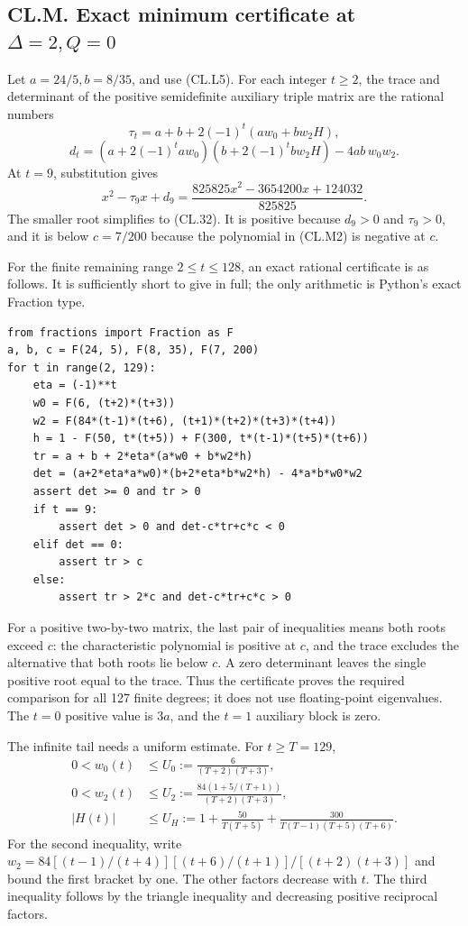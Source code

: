 \documentclass[a4paper,11pt]{article}
\numberwithin{equation}{section}
\begin{document}
\hypertarget{cl.m.-exact-minimum-certificate-at-delta2q0}{%
\subsection{\texorpdfstring{CL.M. Exact minimum certificate at \(\Delta=2,Q=0\)}{CL.M. Exact minimum certificate at \textbackslash Delta=2,Q=0}}\label{cl.m.-exact-minimum-certificate-at-delta2q0}}

Let \(a=24/5,b=8/35\), and use (CL.L5). For each integer \(t\geq2\), the trace and determinant of the positive semidefinite auxiliary triple matrix are the rational numbers \[
\tau_t=a+b+2(-1)^t(aw_0+bw_2H),
\] \[
d_t=(a+2(-1)^taw_0)(b+2(-1)^tbw_2H)-4ab\,w_0w_2.
\tag{CL.M1}
\] At \(t=9\), substitution gives \[
x^2-\tau_9x+d_9
=\frac{825825x^2-3654200x+124032}{825825}.
\tag{CL.M2}
\] The smaller root simplifies to (CL.32). It is positive because \(d_9>0\) and \(\tau_9>0\), and it is below \(c=7/200\) because the polynomial in (CL.M2) is negative at \(c\).

For the finite remaining range \(2\leq t\leq128\), an exact rational certificate is as follows. It is sufficiently short to give in full; the only arithmetic is Python's exact Fraction type.

\begin{verbatim}
from fractions import Fraction as F
a, b, c = F(24, 5), F(8, 35), F(7, 200)
for t in range(2, 129):
    eta = (-1)**t
    w0 = F(6, (t+2)*(t+3))
    w2 = F(84*(t-1)*(t+6), (t+1)*(t+2)*(t+3)*(t+4))
    h = 1 - F(50, t*(t+5)) + F(300, t*(t-1)*(t+5)*(t+6))
    tr = a + b + 2*eta*(a*w0 + b*w2*h)
    det = (a+2*eta*a*w0)*(b+2*eta*b*w2*h) - 4*a*b*w0*w2
    assert det >= 0 and tr > 0
    if t == 9:
        assert det > 0 and det-c*tr+c*c < 0
    elif det == 0:
        assert tr > c
    else:
        assert tr > 2*c and det-c*tr+c*c > 0
\end{verbatim}

For a positive two-by-two matrix, the last pair of inequalities means both roots exceed \(c\): the characteristic polynomial is positive at \(c\), and the trace excludes the alternative that both roots lie below \(c\). A zero determinant leaves the single positive root equal to the trace. Thus the certificate proves the required comparison for all 127 finite degrees; it does not use floating-point eigenvalues. The \(t=0\) positive value is \(3a\), and the \(t=1\) auxiliary block is zero.

The infinite tail needs a uniform estimate. For \(t\geq T=129\), \[
\begin{aligned}
0<w_0(t)&\leq U_0:=\frac6{(T+2)(T+3)},\\
0<w_2(t)&\leq U_2:=
\frac{84(1+5/(T+1))}{(T+2)(T+3)},\\
|H(t)|&\leq U_H:=
1+\frac{50}{T(T+5)}
+\frac{300}{T(T-1)(T+5)(T+6)}.
\end{aligned}
\tag{CL.M3}
\] For the second inequality, write \(w_2=84[(t-1)/(t+4)][(t+6)/(t+1)]/[(t+2)(t+3)]\) and bound the first bracket by one. The other factors decrease with \(t\). The third inequality follows by the triangle inequality and decreasing positive reciprocal factors.
\end{document}
